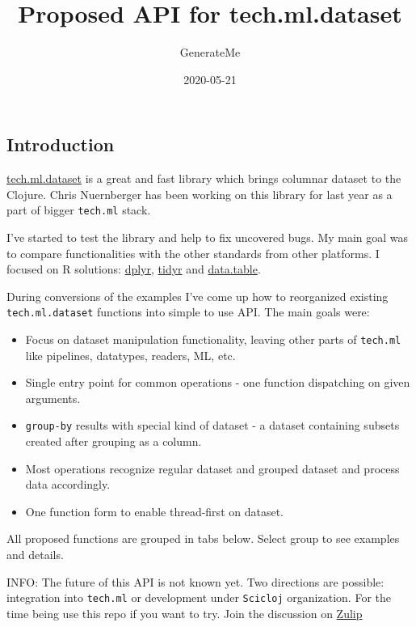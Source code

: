 \documentclass[]{article}
\title{Proposed API for tech.ml.dataset}
\author{GenerateMe}
\date{2020-05-21}
\providecommand{\tightlist}{%
  \setlength{\itemsep}{0pt}\setlength{\parskip}{0pt}}
\begin{document}
\maketitle

\subsection{Introduction}\label{introduction}

\href{https://github.com/techascent/tech.ml.dataset}{tech.ml.dataset} is
a great and fast library which brings columnar dataset to the Clojure.
Chris Nuernberger has been working on this library for last year as a
part of bigger \texttt{tech.ml} stack.

I've started to test the library and help to fix uncovered bugs. My main
goal was to compare functionalities with the other standards from other
platforms. I focused on R solutions:
\href{https://dplyr.tidyverse.org/}{dplyr},
\href{https://tidyr.tidyverse.org/}{tidyr} and
\href{https://rdatatable.gitlab.io/data.table/}{data.table}.

During conversions of the examples I've come up how to reorganized
existing \texttt{tech.ml.dataset} functions into simple to use API. The
main goals were:

\begin{itemize}
\tightlist
\item
  Focus on dataset manipulation functionality, leaving other parts of
  \texttt{tech.ml} like pipelines, datatypes, readers, ML, etc.
\item
  Single entry point for common operations - one function dispatching on
  given arguments.
\item
  \texttt{group-by} results with special kind of dataset - a dataset
  containing subsets created after grouping as a column.
\item
  Most operations recognize regular dataset and grouped dataset and
  process data accordingly.
\item
  One function form to enable thread-first on dataset.
\end{itemize}

All proposed functions are grouped in tabs below. Select group to see
examples and details.

INFO: The future of this API is not known yet. Two directions are
possible: integration into \texttt{tech.ml} or development under
\texttt{Scicloj} organization. For the time being use this repo if you
want to try. Join the discussion on
\href{https://clojurians.zulipchat.com/\#narrow/stream/236259-tech.2Eml.2Edataset.2Edev/topic/api}{Zulip}
\end{document}
